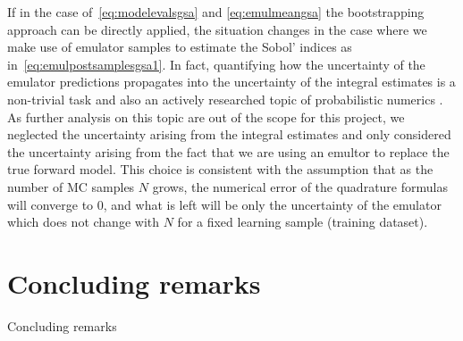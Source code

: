 \vspace{0.2cm}\noindent
If in the case of~\eqref{eq:modelevalsgsa} and \eqref{eq:emulmeangsa} the bootstrapping approach can be directly applied, the situation changes in the case where we make use of emulator samples to estimate the Sobol' indices as in~\eqref{eq:emulpostsamplesgsa1}. In fact, quantifying how the uncertainty of the emulator predictions propagates into the uncertainty of the integral estimates is a non-trivial task and also an actively researched topic of probabilistic numerics . As further analysis on this topic are out of the scope for this project, we neglected the uncertainty arising from the integral estimates and only considered the uncertainty arising from the fact that we are using an emultor to replace the true forward model. This choice is consistent with the assumption that as the number of MC samples $N$ grows, the numerical error of the quadrature formulas will converge to $0$, and what is left will be only the uncertainty of the emulator which does not change with $N$ for a fixed learning sample (training dataset).


%
%
%
\section{Concluding remarks}\label{sec:ch3concludingremarks}
Concluding remarks